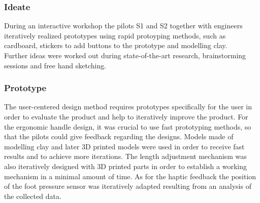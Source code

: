 \documentclass[conference,a4paper]{IEEEtran}
\begin{document}
\subsubsection{Ideate}
During an interactive workshop the pilots S1 and S2 together with engineers iteratively realized prototypes using rapid protoyping methods, such as cardboard, stickers to add buttons to the prototype and modelling clay. \\
Further ideas were worked out during state-of-the-art research, brainstorming sessions and free hand sketching.\\

\subsubsection{Prototype}
The user-centered design method requires prototypes specifically for the user in order to evaluate the product and help to iteratively improve the product. For the ergonomic handle design, it was crucial to use fast prototyping methods, so that the pilots could give feedback regarding the designs. Models made of modelling clay and later 3D printed models were used in order to receive fast results and to achieve more iterations. The length adjustment mechanism was also iteratively designed with 3D printed parts in order to establish a working mechanism in a minimal amount of time. As for the haptic feedback the position of the foot pressure sensor was iteratively adapted resulting from an analysis of the collected data.\\
\end{document}
